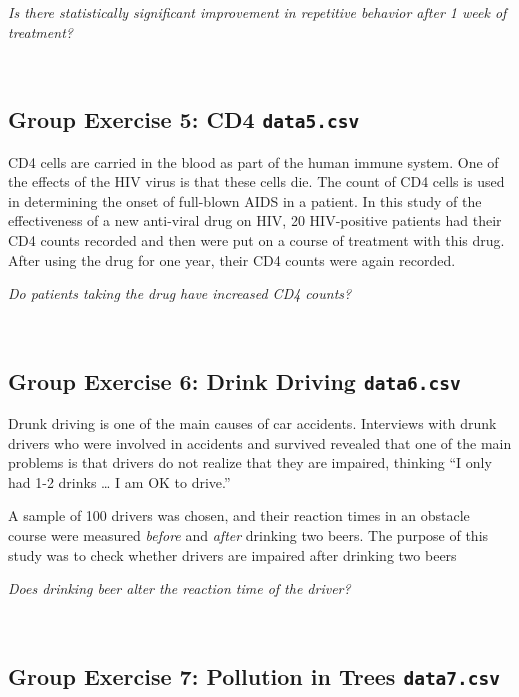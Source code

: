 \documentclass[]{article}
\begin{document}
{\emph{Is there statistically significant improvement in repetitive
behavior after 1 week of treatment?}}

~

\hypertarget{group-exercise-5-cd4-data5.csv}{%
\subsection{\texorpdfstring{Group Exercise 5: CD4
\texttt{data5.csv}}{Group Exercise 5: CD4 data5.csv}}\label{group-exercise-5-cd4-data5.csv}}

CD4 cells are carried in the blood as part of the human immune system.
One of the effects of the HIV virus is that these cells die. The count
of CD4 cells is used in determining the onset of full-blown AIDS in a
patient. In this study of the effectiveness of a new anti-viral drug on
HIV, 20 HIV-positive patients had their CD4 counts recorded and then
were put on a course of treatment with this drug. After using the drug
for one year, their CD4 counts were again recorded.

{\emph{Do patients taking the drug have increased CD4 counts?}}

~

\hypertarget{group-exercise-6-drink-driving-data6.csv}{%
\subsection{\texorpdfstring{Group Exercise 6: Drink Driving
\texttt{data6.csv}}{Group Exercise 6: Drink Driving data6.csv}}\label{group-exercise-6-drink-driving-data6.csv}}

Drunk driving is one of the main causes of car accidents. Interviews
with drunk drivers who were involved in accidents and survived revealed
that one of the main problems is that drivers do not realize that they
are impaired, thinking ``I only had 1-2 drinks \ldots{} I am OK to
drive.''

A sample of 100 drivers was chosen, and their reaction times in an
obstacle course were measured \emph{before} and \emph{after} drinking
two beers. The purpose of this study was to check whether drivers are
impaired after drinking two beers

{\emph{Does drinking beer alter the reaction time of the driver?}}

~

\hypertarget{group-exercise-7-pollution-in-trees-data7.csv}{%
\subsection{\texorpdfstring{Group Exercise 7: Pollution in Trees
\texttt{data7.csv}}{Group Exercise 7: Pollution in Trees data7.csv}}\label{group-exercise-7-pollution-in-trees-data7.csv}}
\end{document}
